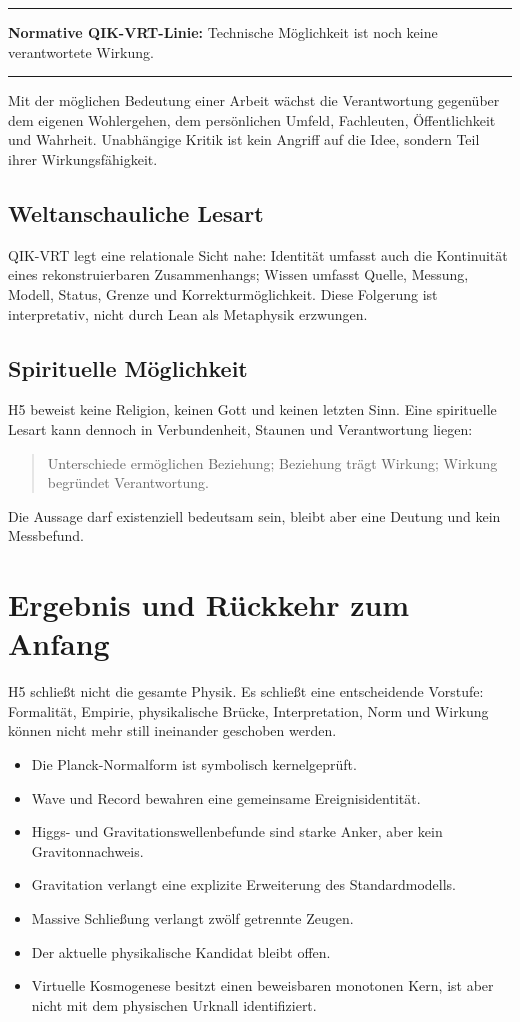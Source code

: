 \documentclass[11pt,a4paper]{article}
\newenvironment{claimbox}{%
  \begin{center}\begin{minipage}{0.92\textwidth}
  \color{qikblue}\hrule\vspace{0.7em}\color{black}
}{%
  \vspace{0.7em}\color{qikblue}\hrule\end{minipage}\end{center}
}
\begin{document}
\begin{claimbox}
\textbf{Normative QIK-VRT-Linie:} Technische Möglichkeit ist noch keine
verantwortete Wirkung.
\end{claimbox}

Mit der möglichen Bedeutung einer Arbeit wächst die Verantwortung gegenüber
dem eigenen Wohlergehen, dem persönlichen Umfeld, Fachleuten, Öffentlichkeit
und Wahrheit. Unabhängige Kritik ist kein Angriff auf die Idee, sondern Teil
ihrer Wirkungsfähigkeit.

\subsection{Weltanschauliche Lesart}

QIK-VRT legt eine relationale Sicht nahe: Identität umfasst auch die
Kontinuität eines rekonstruierbaren Zusammenhangs; Wissen umfasst Quelle,
Messung, Modell, Status, Grenze und Korrekturmöglichkeit. Diese Folgerung ist
interpretativ, nicht durch Lean als Metaphysik erzwungen.

\subsection{Spirituelle Möglichkeit}

H5 beweist keine Religion, keinen Gott und keinen letzten Sinn. Eine
spirituelle Lesart kann dennoch in Verbundenheit, Staunen und Verantwortung
liegen:

\begin{quote}
Unterschiede ermöglichen Beziehung; Beziehung trägt Wirkung; Wirkung begründet
Verantwortung.
\end{quote}

Die Aussage darf existenziell bedeutsam sein, bleibt aber eine Deutung und kein
Messbefund.

\section{Ergebnis und Rückkehr zum Anfang}

H5 schließt nicht die gesamte Physik. Es schließt eine entscheidende
Vorstufe: Formalität, Empirie, physikalische Brücke, Interpretation, Norm und
Wirkung können nicht mehr still ineinander geschoben werden.

\begin{itemize}
  \item Die Planck-Normalform ist symbolisch kernelgeprüft.
  \item Wave und Record bewahren eine gemeinsame Ereignisidentität.
  \item Higgs- und Gravitationswellenbefunde sind starke Anker, aber kein
        Gravitonnachweis.
  \item Gravitation verlangt eine explizite Erweiterung des Standardmodells.
  \item Massive Schließung verlangt zwölf getrennte Zeugen.
  \item Der aktuelle physikalische Kandidat bleibt offen.
  \item Virtuelle Kosmogenese besitzt einen beweisbaren monotonen Kern, ist
        aber nicht mit dem physischen Urknall identifiziert.
\end{itemize}
\end{document}
